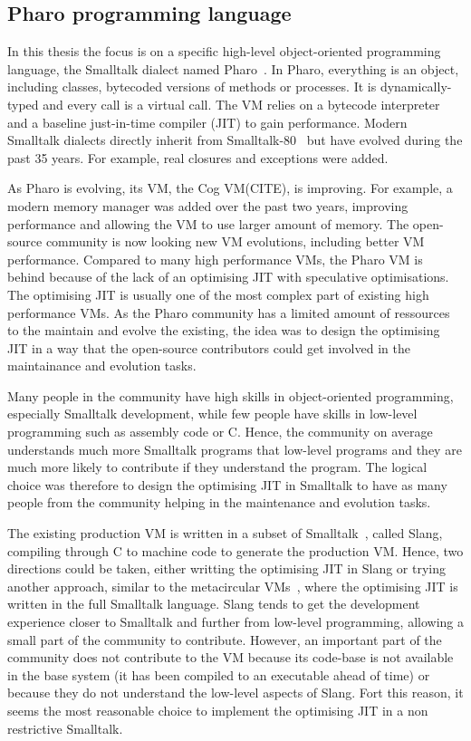 \documentclass[a4paper,12pt,twoside]{../includes/ThesisStyle}
\begin{document}
\subsection{Pharo programming language}

In this thesis the focus is on a specific high-level object-oriented programming language, the Smalltalk dialect named Pharo~\cite{Blac09a}. In Pharo, everything is an object, including classes, bytecoded versions of methods or processes. It is dynamically-typed and every call is a virtual call. The VM relies on a bytecode interpreter and a baseline just-in-time compiler (JIT) to gain performance. Modern Smalltalk dialects directly inherit from Smalltalk-80~\cite{Gold83a} but have evolved during the past 35 years. For example, real closures and exceptions were added.

As Pharo is evolving, its VM, the Cog VM(CITE), is improving. For example, a modern memory manager was added over the past two years, improving performance and allowing the VM to use larger amount of memory. The open-source community is now looking new VM evolutions, including better VM performance. Compared to many high performance VMs, the Pharo VM is behind because of the lack of an optimising JIT with speculative optimisations. The optimising JIT is usually one of the most complex part of existing high performance VMs. As the Pharo community has a limited amount of ressources to the maintain and evolve the existing, the idea was to design the optimising JIT in a way that the open-source contributors could get involved in the maintainance and evolution tasks.

Many people in the community have high skills in object-oriented programming, especially Smalltalk development, while few people have skills in low-level programming such as assembly code or C. Hence, the community on average understands much more Smalltalk programs that low-level programs and they are much more likely to contribute if they understand the program. The logical choice was therefore to design the optimising JIT in Smalltalk to have as many people from the community helping in the maintenance and evolution tasks.

The existing production VM is written in a subset of Smalltalk~\cite{Inga97a}, called Slang, compiling through C to machine code to generate the production VM. Hence, two directions could be taken, either writting the optimising JIT in Slang or trying another approach, similar to the metacircular VMs~\cite{Unga05b,Wimm13a,Alp99a}, where the optimising JIT is written in the full Smalltalk language. Slang tends to get the development experience closer to Smalltalk and further from low-level programming, allowing a small part of the community to contribute. However, an important part of the community does not contribute to the VM because its code-base is not available in the base system (it has been compiled to an executable ahead of time) or because they do not understand the low-level aspects of Slang. Fort this reason, it seems the most reasonable choice to implement the optimising JIT in a non restrictive Smalltalk.
\end{document}
